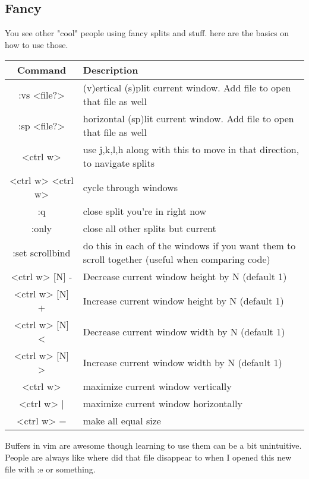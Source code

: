 \documentclass[12pt, letterpaper]{article}
\begin{document}
\subsection{Fancy}
You see other "cool" people using fancy splits and stuff. here are the basics on how to use those.


\begin{table}[H]
    \begin{tabular}{|c|p{9cm}|}
        Command & Description \\
        \hline
        :vs <file?> & (v)ertical (s)plit current window. Add file to open that file as well \\
        \hline
        :sp <file?> & horizontal (sp)lit current window. Add file to open that file as well \\
        \hline
        <ctrl w> & use j,k,l,h along with this to move in that direction, to navigate splits \\
        \hline
        <ctrl w> <ctrl w> & cycle through windows \\
        \hline
        :q & close split you're in right now \\
        \hline
        :only & close all other splits but current \\
        \hline
        :set scrollbind & do this in each of the windows if you want them to scroll together (useful when comparing code) \\
        \hline
        <ctrl w> [N] - & Decrease current window height by N (default 1) \\
        \hline
        <ctrl w> [N] + & Increase current window height by N (default 1) \\
        \hline
        <ctrl w> [N] < & Decrease current window width by N (default 1) \\
        \hline
        <ctrl w> [N] > & Increase current window width by N (default 1) \\
        \hline
        <ctrl w> & maximize current window vertically \\
        \hline
        <ctrl w> | & maximize current window horizontally \\
        \hline
        <ctrl w> = & make all equal size \\
        \hline
    \end{tabular}
\end{table}


Buffers in vim are awesome though learning to use them can be a bit unintuitive. People are always like where did that file disappear to when I opened this new file with :e or something.
\end{document}
